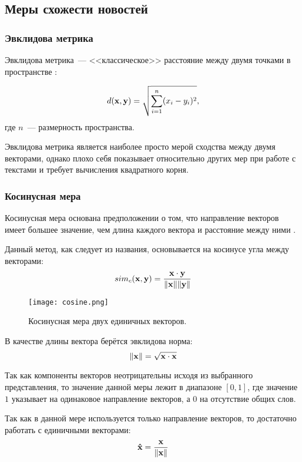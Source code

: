 \subsection{Меры схожести новостей} \label{ssec:similarity}
\subsubsection{Эвклидова метрика}
Эвклидова метрика~--- <<классическое>> расстояние между двумя точками в пространстве \cite{huang08}:

\begin{equation}
    d(\boldsymbol{\mathbf{x}},\boldsymbol{\mathbf{y}})=\sqrt{\sum_{i=1}^n(x_i-y_i)^2},
\end{equation}
где $n$~--- размерность пространства.

Эвклидова метрика является наиболее просто мерой сходства между двумя векторами, однако плохо себя показывает относительно других мер при работе с текстами \cite{strehl00} и требует вычисления квадратного корня.

\subsubsection{Косинусная мера}
Косинусная мера основана предположении о том, что направление векторов имеет большее значение, чем длина каждого вектора и расстояние между ними \cite{zhong05}.

Данный метод, как следует из названия, основывается на косинусе угла между векторами:
\begin{equation}
    sim_c(\boldsymbol{\mathbf{x}},\boldsymbol{\mathbf{y}})=\frac{\boldsymbol{\mathbf{x}}\cdot\boldsymbol{\mathbf{y}}}{\lVert\boldsymbol{\mathbf{x}}\rVert\lVert\boldsymbol{\mathbf{y}}\rVert}
\end{equation}

\begin{figure}[h]
    \centering
    \texttt{[image: cosine.png]}
    \caption{Косинусная мера двух единичных векторов.}
\end{figure}

В качестве длины вектора берётся эвклидова норма:
\begin{equation}
    \lVert\boldsymbol{\mathbf{x}}\rVert=\sqrt{\boldsymbol{\mathbf{x}}\cdot\boldsymbol{\mathbf{x}}}
\end{equation}

Так как компоненты векторов неотрицательны исходя из выбранного представления, то значение данной меры лежит в диапазоне $[0,1]$, где значение $1$ указывает на одинаковое направление векторов, а $0$ на отсутствие общих слов.

Так как в данной мере используется только направление векторов, то достаточно работать с единичными векторами:
\begin{equation}
    \boldsymbol{\mathbf{\hat{x}}}=\frac{\boldsymbol{\mathbf{x}}}{\lVert\boldsymbol{\mathbf{x}}\rVert}
\end{equation}

